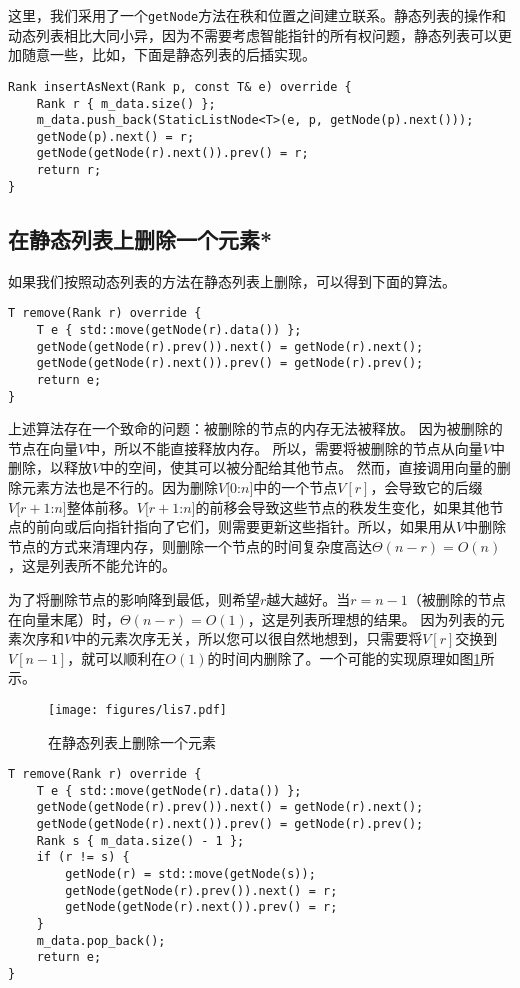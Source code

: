 这里，我们采用了一个\lstinline{getNode}方法在秩和位置之间建立联系。静态列表的操作和动态列表相比大同小异，因为不需要考虑智能指针的所有权问题，静态列表可以更加随意一些，比如，下面是静态列表的后插实现。

\begin{lstlisting}
Rank insertAsNext(Rank p, const T& e) override {
    Rank r { m_data.size() };
    m_data.push_back(StaticListNode<T>(e, p, getNode(p).next()));
    getNode(p).next() = r;
    getNode(getNode(r).next()).prev() = r;
    return r;
}
\end{lstlisting}

\subsection{在静态列表上删除一个元素*}
\label{lis:在静态列表上删除元素}
如果我们按照动态列表的方法在静态列表上删除，可以得到下面的算法。

\begin{lstlisting}
T remove(Rank r) override {
    T e { std::move(getNode(r).data()) };
    getNode(getNode(r).prev()).next() = getNode(r).next();
    getNode(getNode(r).next()).prev() = getNode(r).prev();
    return e;
}
\end{lstlisting}




上述算法存在一个致命的问题：被删除的节点的内存无法被释放。
因为被删除的节点在向量$V$中，所以不能直接释放内存。
所以，需要将被删除的节点从向量$V$中删除，以释放$V$中的空间，使其可以被分配给其他节点。
然而，直接调用向量的删除元素方法也是不行的。因为删除$V[0$:$n]$中的一个节点$V[r]$，会导致它的后缀$V[r+1$:$n]$整体前移。$V[r+1$:$n]$的前移会导致这些节点的秩发生变化，如果其他节点的前向或后向指针指向了它们，则需要更新这些指针。所以，如果用从$V$中删除节点的方式来清理内存，则删除一个节点的时间复杂度高达$\Theta(n-r)=O(n)$，这是列表所不能允许的。


为了将删除节点的影响降到最低，则希望$r$越大越好。当$r=n-1$（被删除的节点在向量末尾）时，$\Theta(n-r)=O(1)$，这是列表所理想的结果。
因为列表的元素次序和$V$中的元素次序无关，所以您可以很自然地想到，只需要将$V[r]$交换到$V[n-1]$，就可以顺利在$O(1)$的时间内删除了。一个可能的实现原理如图\ref{fig:lis7}所示。

\begin{figure}[H]
  \centering
  \texttt{[image: figures/lis7.pdf]}
  \caption{在静态列表上删除一个元素}
  \label{fig:lis7}
\end{figure}

\begin{lstlisting}
T remove(Rank r) override {
    T e { std::move(getNode(r).data()) };
    getNode(getNode(r).prev()).next() = getNode(r).next();
    getNode(getNode(r).next()).prev() = getNode(r).prev();
    Rank s { m_data.size() - 1 };
    if (r != s) {
        getNode(r) = std::move(getNode(s));
        getNode(getNode(r).prev()).next() = r;
        getNode(getNode(r).next()).prev() = r;
    }
    m_data.pop_back();
    return e;
}
\end{lstlisting}




